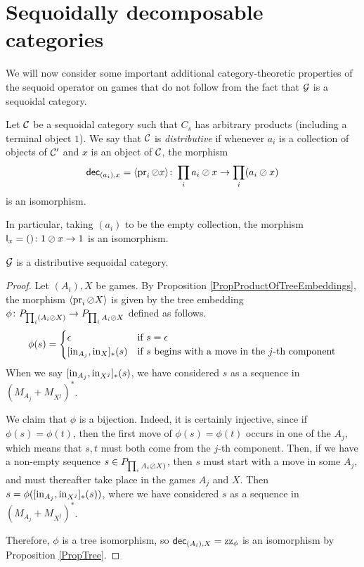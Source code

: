 \documentclass[11pt]{report}
\begin{document}
\section{Sequoidally decomposable categories}

We will now consider some important additional category-theoretic properties of the sequoid operator on games that do not follow from the fact that $\mathcal G$ is a sequoidal category.

\begin{definition}
  Let ${\mathcal{C}}$ be a sequoidal category such that $C_s$ has arbitrary products (including a terminal object $1$).
  We say that ${\mathcal{C}}$ is \emph{distributive} if whenever $a_i$ is a collection of objects of ${\mathcal{C}}'$ and $x$ is an object of ${\mathcal{C}}$, the morphism
  \[
    \operatorname{{\mathsf{dec}}}_{(a_i),x} = \langle \operatorname{pr}_i\oslash x \rangle \colon \prod_ia_i \oslash x \to \prod_i (a_i \oslash x)
    \]
  is an isomorphism.
\end{definition}
\begin{remark}
  In particular, taking $(a_i)$ to be the empty collection, the morphism $\operatorname{{\mathsf{l}}}_x = () \colon 1 \oslash x \to 1$ is an isomorphism.
\end{remark}

\begin{proposition}
  $\mathcal G$ is a distributive sequoidal category.
\end{proposition}
\begin{proof}
  Let $(A_i),X$ be games.
  By Proposition \ref{PropProductOfTreeEmbeddings}, the morphism $\langle \operatorname{pr}_i\oslash X\rangle$ is given by the tree embedding $\phi\colon P_{\prod_i(A_i\oslash X)}\to P_{\prod_iA_i\oslash X}$ defined as follows.
  \[
    \phi(s) = \begin{cases}
      \epsilon & \text{if $s=\epsilon$} \\
      [\inj_{A_j},\inj_{X}]_*(s) & \text{if $s$ begins with a move in the $j$-th component}
    \end{cases}
    \]
  When we say $[\operatorname{in}_{A_j},\operatorname{in}_{X^j}]_*(s)$, we have considered $s$ as a sequence in $(M_{A_j} + M_{X^j})^*$.

  We claim that $\phi$ is a bijection.  
  Indeed, it is certainly injective, since if $\phi(s)=\phi(t)$, then the first move of $\phi(s)=\phi(t)$ occurs in one of the $A_j$, which means that $s,t$ must both come from the $j$-th component.
  Then, if we have a non-empty sequence $s\in P_{\prod_iA_i \oslash X)}$, then $s$ must start with a move in some $A_j$, and must thereafter take place in the games $A_j$ and $X$.  
  Then $s=\phi([\operatorname{in}_{A_j},\operatorname{in}_{X^j}]_*(s))$, where we have considered $s$ as a sequence in $(M_{A_j} + M_{X^j})^*$.

  Therefore, $\phi$ is a tree isomorphism, so $\operatorname{{\mathsf{dec}}}_{(A_i),X} = \operatorname{zz}_\phi$ is an isomorphism by Proposition \ref{PropTree}.
\end{proof}
\end{document}
